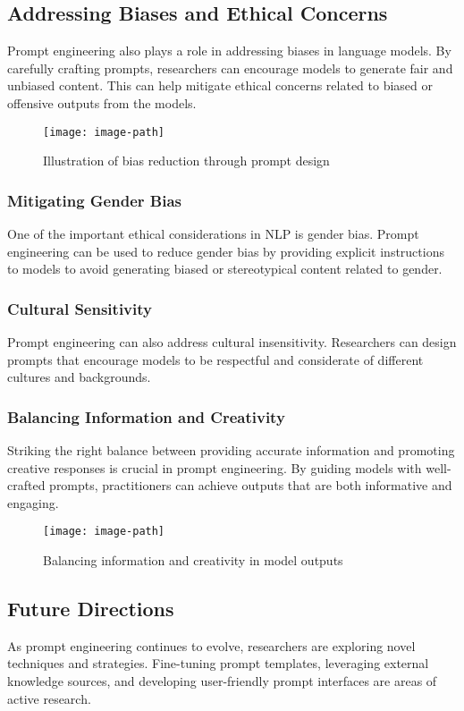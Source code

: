 \subsection{Addressing Biases and Ethical Concerns}
Prompt engineering also plays a role in addressing biases in language models. By carefully crafting prompts, researchers can encourage models to generate fair and unbiased content. This can help mitigate ethical concerns related to biased or offensive outputs from the models.

\begin{figure}[hbt!]
 \centering
 \texttt{[image: image-path]}
 \caption{Illustration of bias reduction through prompt design}
 \label{fig:bias-reduction}
\end{figure}
\FloatBarrier

\subsubsection{Mitigating Gender Bias}
One of the important ethical considerations in NLP is gender bias. Prompt engineering can be used to reduce gender bias by providing explicit instructions to models to avoid generating biased or stereotypical content related to gender.

\subsubsection{Cultural Sensitivity}
Prompt engineering can also address cultural insensitivity. Researchers can design prompts that encourage models to be respectful and considerate of different cultures and backgrounds.

\subsubsection{Balancing Information and Creativity}
Striking the right balance between providing accurate information and promoting creative responses is crucial in prompt engineering. By guiding models with well-crafted prompts, practitioners can achieve outputs that are both informative and engaging.

\begin{figure}[hbt!]
 \centering
 \texttt{[image: image-path]}
 \caption{Balancing information and creativity in model outputs}
 \label{fig:info-creativity}
\end{figure}
\FloatBarrier

\subsection{Future Directions}
As prompt engineering continues to evolve, researchers are exploring novel techniques and strategies. Fine-tuning prompt templates, leveraging external knowledge sources, and developing user-friendly prompt interfaces are areas of active research.

